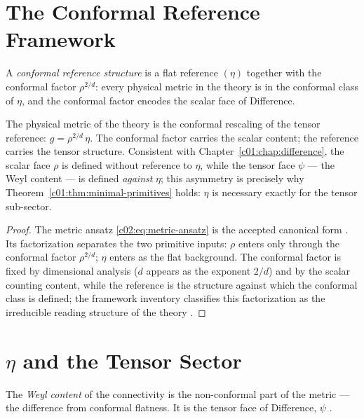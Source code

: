 \section{The Conformal Reference Framework}
\label{c02:sec:conformal-framework}

\begin{definition}
\label{c02:def:conformal}
A \emph{conformal reference structure} is a flat reference $(\eta)$ together with the
conformal factor $\rho^{2/d}$: every physical metric in the theory is in the conformal class
of $\eta$, and the conformal factor encodes the scalar face of Difference.
\end{definition}

\begin{theorem}
\label{c02:thm:conformal}
The physical metric of the theory is the conformal rescaling of the tensor reference:
$g = \rho^{2/d}\,\eta$. The conformal factor carries the scalar content; the reference
carries the tensor structure. Consistent with Chapter~\ref{c01:chap:difference}, the scalar
face $\rho$ is defined without reference to $\eta$, while the tensor face $\psi$ --- the Weyl
content --- is defined \emph{against} $\eta$; this asymmetry is precisely why
Theorem~\ref{c01:thm:minimal-primitives} holds: $\eta$ is
necessary exactly for the tensor sub-sector.
\end{theorem}

\begin{proof}
The metric ansatz \eqref{c02:eq:metric-ansatz} is the accepted canonical form \cite{c02:QG290}.
Its factorization separates the two primitive inputs: $\rho$ enters only through the conformal
factor $\rho^{2/d}$; $\eta$ enters as the flat background. The conformal factor is fixed by
dimensional analysis ($d$ appears as the exponent $2/d$) and by the scalar counting content,
while the reference is the structure against which the conformal class is defined; the
framework inventory classifies this factorization as the irreducible reading structure of the
theory \cite{c02:QG290}.
\end{proof}

\section{\texorpdfstring{$\eta$}{eta} and the Tensor Sector}
\label{c02:sec:eta-tensor}

\begin{definition}
\label{c02:def:weyl}
The \emph{Weyl content} of the connectivity is the non-conformal part of the metric --- the
difference from conformal flatness. It is the tensor face of Difference, $\psi$
\cite{c02:QG285}.
\end{definition}

